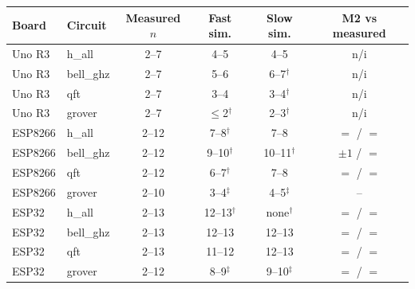 \begin{tabular}{@{}llcccc@{}}
\toprule
Board & Circuit & Measured $n$ & Fast sim. & Slow sim. & M2 vs measured \\
\midrule
Uno R3 & h\_all & 2--7 & 4--5 & 4--5 & n/i \\
Uno R3 & bell\_ghz & 2--7 & 5--6 & 6--7$^{\dagger}$ & n/i \\
Uno R3 & qft & 2--7 & 3--4 & 3--4$^{\dagger}$ & n/i \\
Uno R3 & grover & 2--7 & $\le$2$^{\dagger}$ & 2--3$^{\dagger}$ & n/i \\
ESP8266 & h\_all & 2--12 & 7--8$^{\dagger}$ & 7--8 & $=$ / $=$ \\
ESP8266 & bell\_ghz & 2--12 & 9--10$^{\dagger}$ & 10--11$^{\dagger}$ & $\pm1$ / $=$ \\
ESP8266 & qft & 2--12 & 6--7$^{\dagger}$ & 7--8 & $=$ / $=$ \\
ESP8266 & grover & 2--10 & 3--4$^{\ddagger}$ & 4--5$^{\ddagger}$ & -- \\
ESP32 & h\_all & 2--13 & 12--13$^{\dagger}$ & none$^{\dagger}$ & $=$ / $=$ \\
ESP32 & bell\_ghz & 2--13 & 12--13 & 12--13 & $=$ / $=$ \\
ESP32 & qft & 2--13 & 11--12 & 12--13 & $=$ / $=$ \\
ESP32 & grover & 2--12 & 8--9$^{\ddagger}$ & 9--10$^{\ddagger}$ & $=$ / $=$ \\
\bottomrule
\end{tabular}
